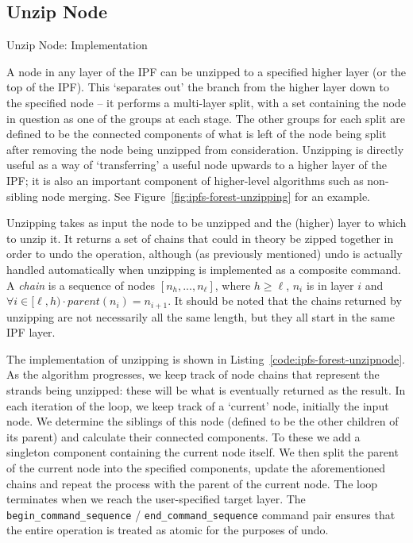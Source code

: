 \documentclass[10pt,twocolumn,twoside]{IEEEtran}
\begin{document}
\subsection{Unzip Node}

\begin{stulisting}[t]
\caption{Unzip Node: Implementation}
\label{code:ipfs-forest-unzipnode}

\end{stulisting}

A node in any layer of the IPF can be unzipped to a specified higher layer (or the top of the IPF). This `separates out' the branch from the higher layer down to the specified node -- it performs a multi-layer split, with a set containing the node in question as one of the groups at each stage. The other groups for each split are defined to be the connected components of what is left of the node being split after removing the node being unzipped from consideration. Unzipping is directly useful as a way of `transferring' a useful node upwards to a higher layer of the IPF; it is also an important component of higher-level algorithms such as non-sibling node merging. See Figure~\ref{fig:ipfs-forest-unzipping} for an example.

Unzipping takes as input the node to be unzipped and the (higher) layer to which to unzip it. It returns a set of chains that could in theory be zipped together in order to undo the operation, although (as previously mentioned) undo is actually handled automatically when unzipping is implemented as a composite command. A \emph{chain} is a sequence of nodes $[n_h,...,n_\ell]$, where $h \ge \ell$, $n_i$ is in layer $i$ and $\forall i \in [\ell,h) \cdot parent(n_i) = n_{i+1}$. It should be noted that the chains returned by unzipping are not necessarily all the same length, but they all start in the same IPF layer.

The implementation of unzipping is shown in Listing~\ref{code:ipfs-forest-unzipnode}. As the algorithm progresses, we keep track of node chains that represent the strands being unzipped: these will be what is eventually returned as the result. In each iteration of the loop, we keep track of a `current' node, initially the input node. We determine the siblings of this node (defined to be the other children of its parent) and calculate their connected components. To these we add a singleton component containing the current node itself. We then split the parent of the current node into the specified components, update the aforementioned chains and repeat the process with the parent of the current node. The loop terminates when we reach the user-specified target layer. The {\small\verb|begin_command_sequence|} / {\small\verb|end_command_sequence|} command pair ensures that the entire operation is treated as atomic for the purposes of undo.
\end{document}
